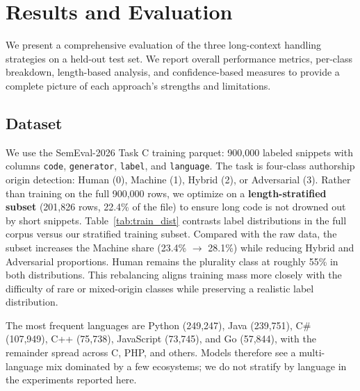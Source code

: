 \documentclass[conference]{IEEEtran}
\begin{document}
\section{Results and Evaluation}

We present a comprehensive evaluation of the three long-context handling strategies on a held-out test set. We report overall performance metrics, per-class breakdown, length-based analysis, and confidence-based measures to provide a complete picture of each approach's strengths and limitations.

\subsection{Dataset}

We use the SemEval-2026 Task C training parquet: 900{,}000 labeled snippets with columns \texttt{code}, \texttt{generator}, \texttt{label}, and \texttt{language}. The task is four-class authorship origin detection: Human (0), Machine (1), Hybrid (2), or Adversarial (3). Rather than training on the full 900{,}000 rows, we optimize on a \textbf{length-stratified subset} (201{,}826 rows, 22.4\% of the file) to ensure long code is not drowned out by short snippets. Table~\ref{tab:train_dist} contrasts label distributions in the full corpus versus our stratified training subset. Compared with the raw data, the subset increases the Machine share (23.4\% $\rightarrow$ 28.1\%) while reducing Hybrid and Adversarial proportions. Human remains the plurality class at roughly 55\% in both distributions. This rebalancing aligns training mass more closely with the difficulty of rare or mixed-origin classes while preserving a realistic label distribution.

The most frequent languages are Python (249{,}247), Java (239{,}751), C\# (107{,}949), C++ (75{,}738), JavaScript (73{,}745), and Go (57{,}844), with the remainder spread across C, PHP, and others. Models therefore see a multi-language mix dominated by a few ecosystems; we do not stratify by language in the experiments reported here.
\end{document}
